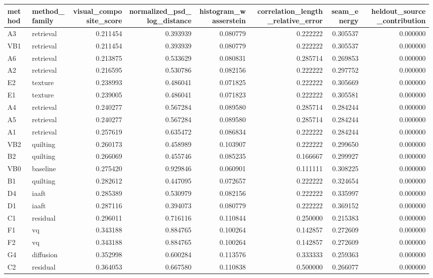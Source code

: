 \begin{tabular}{llrrrrrr}
\toprule
method & method_family & visual_composite_score & normalized_psd_log_distance & histogram_wasserstein & correlation_length_relative_error & seam_energy & heldout_source_contribution \\
\midrule
A3 & retrieval & 0.211454 & 0.393939 & 0.080779 & 0.222222 & 0.305537 & 0.000000 \\
VB1 & retrieval & 0.211454 & 0.393939 & 0.080779 & 0.222222 & 0.305537 & 0.000000 \\
A6 & retrieval & 0.213875 & 0.533629 & 0.080831 & 0.285714 & 0.269853 & 0.000000 \\
A2 & retrieval & 0.216595 & 0.530786 & 0.082156 & 0.222222 & 0.297752 & 0.000000 \\
E2 & texture & 0.238993 & 0.486041 & 0.071825 & 0.222222 & 0.305669 & 0.000000 \\
E1 & texture & 0.239005 & 0.486041 & 0.071823 & 0.222222 & 0.305581 & 0.000000 \\
A4 & retrieval & 0.240277 & 0.567284 & 0.089580 & 0.285714 & 0.284244 & 0.000000 \\
A5 & retrieval & 0.240277 & 0.567284 & 0.089580 & 0.285714 & 0.284244 & 0.000000 \\
A1 & retrieval & 0.257619 & 0.635472 & 0.086834 & 0.222222 & 0.284244 & 0.000000 \\
VB2 & quilting & 0.260173 & 0.458989 & 0.103907 & 0.222222 & 0.299650 & 0.000000 \\
B2 & quilting & 0.266069 & 0.455746 & 0.085235 & 0.166667 & 0.299927 & 0.000000 \\
VB0 & baseline & 0.275420 & 0.929846 & 0.060901 & 0.111111 & 0.308225 & 0.000000 \\
B1 & quilting & 0.282612 & 0.447095 & 0.072657 & 0.222222 & 0.324654 & 0.000000 \\
D4 & iaaft & 0.285389 & 0.530979 & 0.082156 & 0.222222 & 0.335997 & 0.000000 \\
D1 & iaaft & 0.287116 & 0.394073 & 0.080779 & 0.222222 & 0.369152 & 0.000000 \\
C1 & residual & 0.296011 & 0.716116 & 0.110844 & 0.250000 & 0.215383 & 0.000000 \\
F1 & vq & 0.343188 & 0.884765 & 0.100264 & 0.142857 & 0.272609 & 0.000000 \\
F2 & vq & 0.343188 & 0.884765 & 0.100264 & 0.142857 & 0.272609 & 0.000000 \\
G4 & diffusion & 0.352998 & 0.600284 & 0.113576 & 0.333333 & 0.259363 & 0.000000 \\
C2 & residual & 0.364053 & 0.667580 & 0.110838 & 0.500000 & 0.266077 & 0.000000 \\
\bottomrule
\end{tabular}
